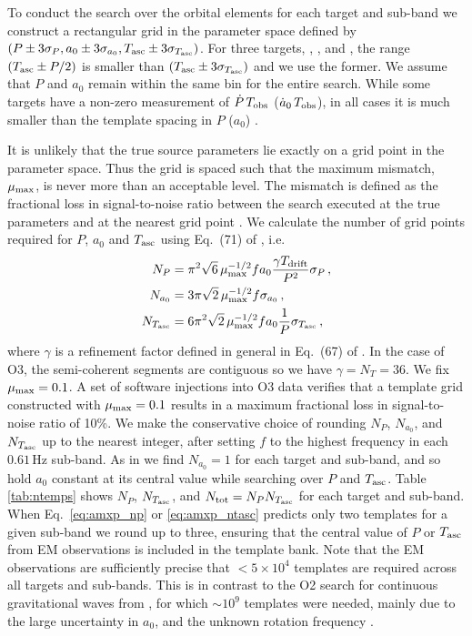To conduct the search over the orbital elements for each target and sub-band we construct a rectangular grid in the parameter space defined by $(P \pm 3\sigma_P, a_0 \pm 3\sigma_{a_0}, T_{\textrm{asc}} \pm 3\sigma_{T_{\textrm{asc}}})$. For three targets, \xtea, \igrb, and \igri, the range $(T_{\textrm{asc}} \pm P/2)$ is smaller than $(T_{\textrm{asc}} \pm 3\sigma_{T_{\textrm{asc}}})$ and we use the former. We assume that $P$ and $a_0$ remain within the same bin for the entire search. While some targets have a non-zero measurement of $\dot{P}\, T_{\rm obs}$ ($\dot{a}_0\, T_{\rm obs}$), in all cases it is much smaller than the template spacing in $P$ ($a_0$) \cite{Patruno1808, Patruno0029, Bult2021}.

It is unlikely that the true source parameters lie exactly on a grid point in the parameter space. Thus the grid is spaced such that the maximum mismatch, $\mu_{\rm max}$, is never more than an acceptable level. The mismatch is defined as the fractional loss in signal-to-noise ratio between the search executed at the true parameters and at the nearest grid point \cite{Leaci2015}. We calculate the number of grid points required for $P$, $a_0$ and $T_{\textrm{asc}}$ using Eq.~(71) of \citet{Leaci2015}, i.e.
\begin{align}
N_P &= \pi^2\sqrt{6}\, \mu_{\rm max}^{-1/2} f a_0  \frac{\gamma T_{\textrm{drift}}}{P^2} \sigma_P\,,\label{eq:amxp_np}\\
N_{a_0} &= 3\pi\sqrt{2}\, \mu_{\rm max}^{-1/2} f \sigma_{a_0}	\,,\label{eq:amxp_na0}\\
N_{T_{\textrm{asc}}} &= 6\pi^2\sqrt{2}\, \mu_{\rm max}^{-1/2} f a_0 \frac{1}{P} \sigma_{T_{\textrm{asc}}}	\,,\label{eq:amxp_ntasc}
\end{align}
where $\gamma$ is a refinement factor defined in general in Eq.~(67) of \citet{Leaci2015}. In the case of O3, the semi-coherent segments are contiguous so we have $\gamma = N_T = 36$. We fix $\mu_{\rm max} = 0.1$. A set of software injections into O3 data verifies that a template grid constructed with $\mu_{\rm max} = 0.1$ results in a maximum fractional loss in signal-to-noise ratio of 10\%. We make the conservative choice of rounding $N_P$, $N_{a_0}$, and $N_{T_{\textrm{asc}}}$ up to the nearest integer, after setting $f$ to the highest frequency in each $0.61\,$Hz sub-band. As in \citet{Middleton2020} we find $N_{a_0} = 1$ for each target and sub-band, and so hold $a_0$ constant at its central value while searching over $P$ and $T_{\textrm{asc}}$. Table \ref{tab:ntemps} shows $N_P$, $N_{T_{\textrm{asc}}}$, and $N_{\rm tot} = N_P N_{T_{\textrm{asc}}}$ for each target and sub-band. When Eq.~\eqref{eq:amxp_np} or \eqref{eq:amxp_ntasc} predicts only two templates for a given sub-band we round up to three, ensuring that the central value of $P$ or $T_{\textrm{asc}}$ from EM observations is included in the template bank. Note that the EM observations are sufficiently precise that $<5\times10^{4}$ templates are required across all targets and sub-bands. This is in contrast to the O2 search for continuous gravitational waves from \sco, for which $\sim10^9$ templates were needed, mainly due to the large uncertainty in $a_0$, and the unknown rotation frequency \cite{o2vitsco}.

